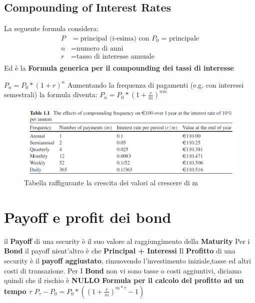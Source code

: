 \documentclass[a4paper,11pt]{report}
\begin{document}
{\subsection{Compounding of Interest Rates}
La seguente formula considera: 
\begin{align*}
P &= \text{principal (i-esima) con $P_0$ = principale} \\
n &= \text{numero di anni}\\
r &= \text{tasso di interesse annuale}\\
\end{align*}
Ed è la \textbf{Formula generica per il compounding dei tassi di interesse} 
\begin{center}
 $P_n=P_0*(1+r)^n$  \newline
Aumentando la frequenza di pagamenti (e.g. con interessi semestrali) la formula diventa: \newline
 $P_n=P_0*(1+{\frac {r}{m}})^{nm} $ \newline
\end{center}
\begin{figure}[h!]
\includegraphics[width=\linewidth]{TableInterests.png}
\caption {Tabella raffigurante la crescita dei valori al crescere di m}
\end{figure}
\newpage

\section {Payoff e profit dei bond}
il \textbf{Payoff} di una security è il suo valore al raggiungimento della  \textbf{Maturity } 
Per i \textbf{Bond} il payoff nient'altro è che \textbf{Principal + Interessi} \newline
Il \textbf{Profitto} di una security è il \textbf{payoff aggiustato}, rimuovendo l'investimento iniziale,tasse ed altri costi di transazione. \newline
Per I \textbf{Bond} non vi sono tasse o costi aggiuntivi, diciamo quindi che il rischio è \textbf{NULLO}
\newline \textbf{Formula per il calcolo del profitto ad un tempo $\tau$} \newline
{\LARGE {$P_\tau - P_0 = P_0*((1+{\frac {r}{m}})^{m*\tau}-1)$}}
}
\end{document}
